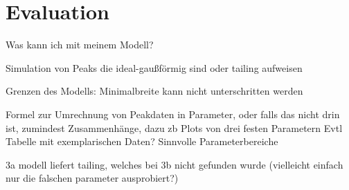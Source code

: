 
\chapter{Evaluation}
\label{chapter:eva}

Was kann ich mit meinem Modell?

Simulation von Peaks die ideal-gaußförmig sind oder tailing aufweisen

Grenzen des Modells:
Minimalbreite kann nicht unterschritten werden


Formel zur Umrechnung von Peakdaten in Parameter, oder falls das nicht drin ist, zumindest Zusammenhänge, dazu zb Plots von drei festen Parametern
Evtl Tabelle mit exemplarischen Daten?
Sinnvolle Parameterbereiche

3a modell liefert tailing, welches bei 3b nicht gefunden wurde (vielleicht einfach nur die falschen parameter ausprobiert?)
